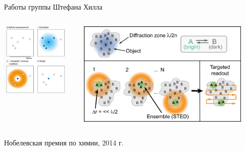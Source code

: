 \documentclass[9pt, compress, xcolor=table]{beamer}
\begin{document}
\begin{frame}{Работы группы Штефана Хилла}

\begin{columns}[c] \column{6.5cm}

\begin{center}
\includegraphics[width=0.9\textwidth]{STED1}
\end{center}

\column{6.5cm}
\begin{center}
\includegraphics[width=0.9\textwidth]{STED2}
\end{center}

\end{columns}

Нобелевская премия по химии, 2014 г.

\end{frame}
\end{document}
